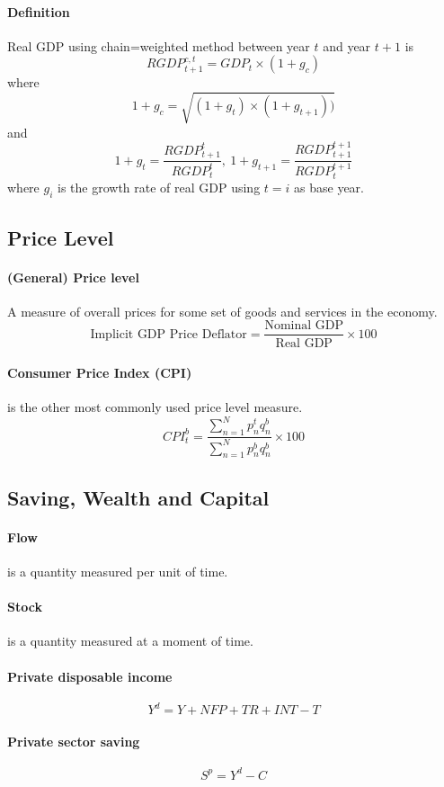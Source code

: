 \documentclass[11pt]{article}
\begin{document}
		\paragraph{Definition} Real GDP using chain=weighted method between year $t$ and year $t+1$ is 
		\[
			RGDP_{t+1}^{c, t} = GDP_t \times (1+g_c)
		\] where 
		\[
			1 + g_c = \sqrt{(1+g_t) \times (1 + g_{t+1}))}
		\] and 
		\[
			1 + g_t = \frac{RGDP_{t+1}^t}{RGDP_{t}^t},\ 1 + g_{t+1} = \frac{RGDP_{t+1}^{t+1}}{RGDP_{t}^{t+1}}
		\] where $g_i$ is the growth rate of real GDP using $t=i$ as base year.
		

\subsection{Price Level}
	\paragraph{(General) Price level} A  measure of overall prices for some set of goods and services in the economy.
	\[
		\text{Implicit GDP Price Deflator} = \frac{\text{Nominal GDP}}{\text{Real GDP}} \times 100
	\]
	\paragraph{Consumer Price Index (CPI)}is the other most commonly used price level measure.
	\[
		CPI_t^b = \frac{\sum_{n=1}^N p_n^t q_n^b}{\sum_{n=1}^N p_n^b q_n^b} \times 100
	\]

\subsection{Saving, Wealth and Capital}
	\paragraph{Flow} is a quantity measured per unit of time.
	\paragraph{Stock} is a quantity measured at a moment of time.
	\paragraph{Private disposable income}
	\[
		Y^d = Y + NFP + TR + INT - T
	\]
	\paragraph{Private sector saving}
	\[
		S^p = Y^d - C
	\]
\end{document}
